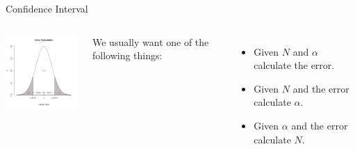 \begin{frame}{Confidence Interval}

  \begin{columns}

    \centerline{\includegraphics[width=4cm]{img/confidenceInterval}}


    We usually want one of the following things:
    \begin{itemize}
    \item Given $N$ and $\alpha$ calculate the error.
    \item Given $N$ and the error calculate $\alpha$.
    \item Given $\alpha$ and the error calculate $N$.
    \end{itemize}

  \end{columns}
  
\end{frame}


